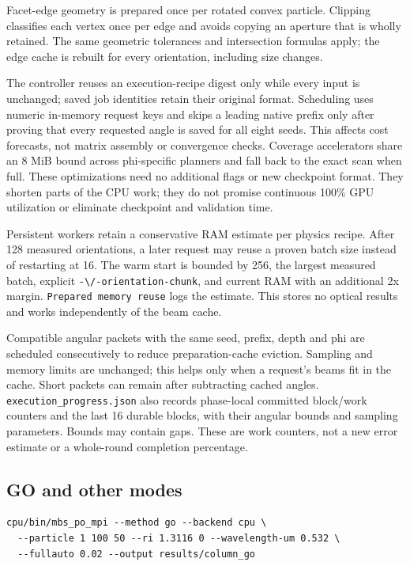 Facet-edge geometry is prepared once per rotated convex particle.
Clipping classifies each vertex once per edge and avoids copying an
aperture that is wholly retained. The same geometric tolerances and
intersection formulas apply; the edge cache is rebuilt for every
orientation, including size changes.

The controller reuses an execution-recipe digest only while every input
is unchanged; saved job identities retain their original format.
Scheduling uses numeric in-memory request keys and skips a leading
native prefix only after proving that every requested angle is saved for
all eight seeds. This affects cost forecasts, not matrix assembly or
convergence checks. Coverage accelerators share an 8 MiB bound across
phi-specific planners and fall back to the exact scan when full. These
optimizations need no additional flags or new checkpoint format. They
shorten parts of the CPU work; they do not promise continuous 100\% GPU
utilization or eliminate checkpoint and validation time.

Persistent workers retain a conservative RAM estimate per physics
recipe. After 128 measured orientations, a later request may reuse a
proven batch size instead of restarting at 16. The warm start is bounded
by 256, the largest measured batch, explicit
\nolinkurl{-\/-orientation-chunk}, and current RAM with an additional 2x
margin. \texttt{Prepared\ memory\ reuse} logs the estimate. This stores
no optical results and works independently of the beam cache.

Compatible angular packets with the same seed, prefix, depth and phi are
scheduled consecutively to reduce preparation-cache eviction. Sampling
and memory limits are unchanged; this helps only when a request's beams
fit in the cache. Short packets can remain after subtracting cached
angles. \nolinkurl{execution_progress.json} also records phase-local
committed block/work counters and the last 16 durable blocks, with their
angular bounds and sampling parameters. Bounds may contain gaps. These
are work counters, not a new error estimate or a whole-round completion
percentage.

\subsection{GO and other modes}\label{go-and-other-modes}

\noindent\begin{minipage}{\linewidth}
\begin{verbatim}
cpu/bin/mbs_po_mpi --method go --backend cpu \
  --particle 1 100 50 --ri 1.3116 0 --wavelength-um 0.532 \
  --fullauto 0.02 --output results/column_go
\end{verbatim}
\end{minipage}

